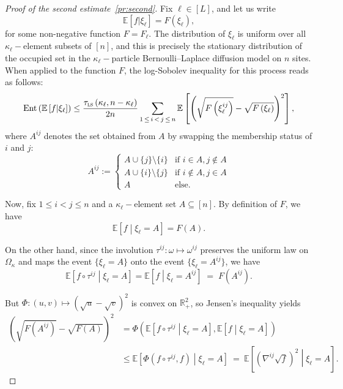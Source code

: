 \documentclass[10pt]{amsart}
\theoremstyle{definition}\newtheorem{defi}[theo]{Definition}\newtheorem{rema}[theo]{Remark}\newtheorem{exam}[theo]{Example}\newtheorem{exem}[theo]{Example}\newtheorem{nota}[theo]{Notation}
\newcommand{\R}{\mathbb{R}}
\newcommand{\EE}{\mathbb{E}}
\newcommand{\tls}{\tau_{\textsc{ls}}}
\DeclareMathOperator{\ent}{Ent}
\begin{document}
\begin{proof}[Proof of the second estimate~\eqref{pr:second}]
Fix $\ell\in[L]$, and let us write
\begin{equation}\label{def:F}
\EE\left[f|\xi_\ell\right] = F\left(\xi_\ell\right),
\end{equation}
for some non-negative function $F=F_\ell$. The distribution of $\xi_\ell$ is uniform over all $\kappa_\ell-$element subsets of $[n]$, and this is precisely the stationary distribution of the occupied set in the $\kappa_\ell-$particle Bernoulli--Laplace diffusion model on $n$ sites. When applied to the function $F$, the log-Sobolev inequality for this process reads as follows:
\begin{equation}\label{induced}
\ent\left(\EE\left[f|\xi_\ell\right]\right) \le \frac {\tls\left(\kappa_\ell,n-\kappa_\ell\right)}{2n}\sum_{1\,\le\,i\,<\,j\,\le\,n}\EE\left[\left(\sqrt{F\left(\xi_\ell^{ij}\right)}-\sqrt{F\left(\xi_\ell\right)}\right)^2\right],
\end{equation}
where $A^{ij}$ denotes the set obtained from $A$ by swapping the membership status of $i$ and $j$:
\[
A^{ij} :=  
\begin{cases}
A\cup\{j\}\setminus\{i\} & \text{if }i\in A,j\notin A\\
A\cup\{i\}\setminus\{j\} & \text{if }i\notin A,j\in A\\
A & \text{else.}
\end{cases}
\]

Now, fix $1\le i<j\le n$ and a $\kappa_\ell-$element set $A\subseteq[n]$. By definition of $F$, we have
\[
\EE\left[f\middle|\xi_\ell=A\right] = F(A).
\]

On the other hand, since the involution $\tau^{ij}\colon\omega\mapsto \omega^{ij}$ preserves the uniform law on $\Omega_\kappa$ and maps the event $\{\xi_\ell=A\}$ onto the event $\{\xi_\ell=A^{ij}\}$, we have
\[
\EE\left[f\circ\tau^{ij}\middle|\xi_\ell=A\right] = \EE\left[f\middle|\xi_\ell=A^{ij}\right] \; = \; F\left(A^{ij}\right).
\]

But $\Phi\colon (u,v)\mapsto (\sqrt{u}-\sqrt{v})^2 $ is convex on $\R_+^2$, so Jensen's inequality yields
\begin{align*}
\left(\sqrt{F\left(A^{ij}\right)}-\sqrt{F(A)}\right)^2 & = \Phi\left(\EE\left[f\circ\tau^{ij}\middle|\xi_\ell=A\right],\EE\left[f\middle|\xi_\ell=A\right]\right)\\
& \le \EE\left[\Phi\left(f\circ\tau^{ij},f\right)\middle|\xi_\ell=A\right] \ = \ \EE\left[\left(\nabla^{ij} \sqrt{f}\right)^2\middle|\xi_\ell=A\right].
\end{align*}


\end{proof}
\end{document}
